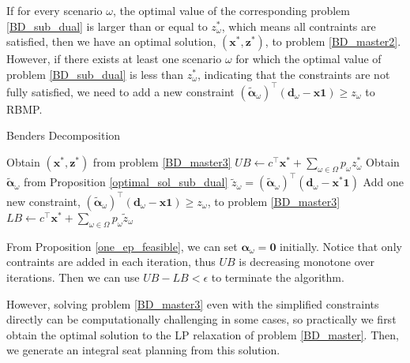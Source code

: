 If for every scenario $\omega$, the optimal value of the corresponding problem \eqref{BD_sub_dual} is larger than or equal to $z_{\omega}^{*}$, which means all contraints are satisfied, then we have an optimal solution, $(\mathbf{x}^{*}, \mathbf{z}^{*})$, to problem \eqref{BD_master2}. However, if there exists at least one scenario $\omega$ for which the optimal value of problem \eqref{BD_sub_dual} is less than $z_{\omega}^{*}$, indicating that the constraints are not fully satisfied, we need to add a new constraint $(\bm{\tilde{\alpha}}_{\omega})^{\intercal}(\mathbf{d}_{\omega} - \mathbf{x} \mathbf{1}) \geq z_{\omega}$ to RBMP.


\begin{algorithm}[h]
    \caption{Benders Decomposition}\label{cut_algo}
      {Obtain $(\mathbf{x}^{*}, \mathbf{z}^{*})$ from problem \eqref{BD_master3}\;
      $UB \gets c^{\intercal} \mathbf{x}^{*} + \sum_{\omega \in \Omega} p_{\omega} z_{\omega}^{*}$\;
      {Obtain $\bm{\tilde{\alpha}}_{\omega}$ from Proposition \ref{optimal_sol_sub_dual}\; $\tilde{z}_{\omega}= (\bm{\tilde{\alpha}}_{\omega})^{\intercal}(\mathbf{d}_{\omega}- \mathbf{x}^{*} \mathbf{1})$\;
      {Add one new constraint, $(\bm{\tilde{\alpha}}_{\omega})^{\intercal}(\mathbf{d}_{\omega}- \mathbf{x} \mathbf{1}) \geq z_{\omega}$, to problem \eqref{BD_master3}\;}
      }
      {$LB \gets c^{\intercal} \mathbf{x}^{*} + \sum_{\omega \in \Omega} p_{\omega} \tilde{z}_{\omega} $\;}
      }
\end{algorithm}

From Proposition \ref{one_ep_feasible}, we can set $\bm{\alpha}_{\omega} = \mathbf{0}$ initially. Notice that only contraints are added in each iteration, thus $UB$ is decreasing monotone over iterations. Then we can use $UB - LB < \epsilon$ to terminate the algorithm.

However, solving problem \eqref{BD_master3} even with the simplified constraints directly can be computationally challenging in some cases, so practically we first obtain the optimal solution to the LP relaxation of problem \eqref{BD_master}. Then, we generate an integral seat planning from this solution.

